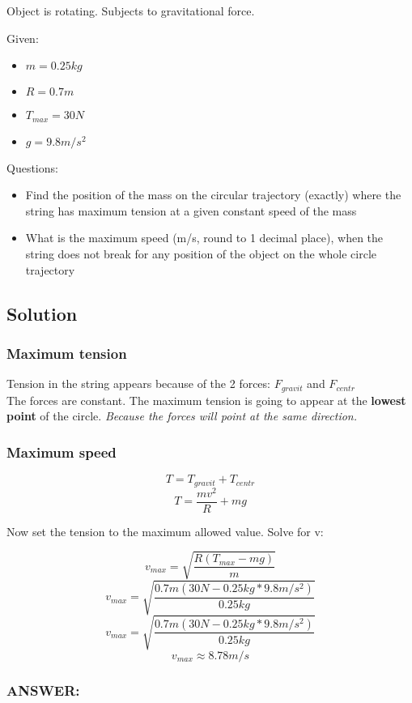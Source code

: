 
Object is rotating. Subjects to gravitational force.


\bigbreak Given: 
\begin{itemize}
    \item $  m  = 0.25kg $
    \item $ R = 0.7m $
    \item $ T_{max} = 30N $
    \item $ g = 9.8m/s^2 $
\end{itemize}


\bigbreak Questions:
\begin{itemize}
    \item Find the position of the mass on the circular trajectory (exactly) where the string has
    maximum tension at a given constant speed of the mass
    \item What is the maximum speed (m/s, round to 1 decimal place), when the string does not
    break for any position of the object on the whole circle trajectory
\end{itemize}

\subsection*{Solution}
\subsubsection*{Maximum tension}
Tension in the string appears because of the 2 forces: $F_{gravit}$ and $F_{centr}$ \\
The forces are constant. The maximum tension is going to appear at the \textbf{lowest point} of the circle.
\textit{Because the forces will point at the same direction.}


\subsubsection*{Maximum speed}
$$ T = T_{gravit} + T_{centr} $$
$$ T = \frac{mv^2}{R} + mg $$

Now set the tension to the maximum allowed value. Solve for v:

$$  v_{max} =  \sqrt{\frac{R(T_{max} - mg)}{m}} $$
$$  v_{max} =  \sqrt{\frac{0.7m(30N - 0.25kg * 9.8m/s^2)}{0.25kg}} $$
$$  v_{max} =  \sqrt{\frac{0.7m(30N - 0.25kg * 9.8m/s^2)}{0.25kg}} $$
$$  v_{max} \approx  \boxed{8.78m/s} $$

\vfill \subsubsection{ANSWER:}




